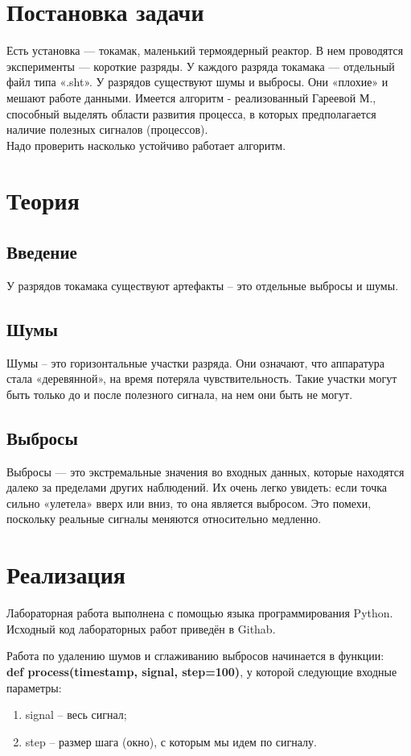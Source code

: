 \documentclass[main.tex]{subfiles}
\begin{document}
	
	\newpage
	\listoffigures{}
	\newpage
	
\section{Постановка задачи}
	Есть установка — токамак, маленький термоядерный реактор. В нем проводятся эксперименты — короткие разряды. \cite{tok} У каждого разряда токамака — отдельный файл типа «.sht».
	У разрядов существуют шумы и выбросы. Они «плохие» и мешают работе данными.
	Имеется алгоритм - реализованный Гареевой М., способный выделять области развития процесса, в которых предполагается наличие полезных сигналов (процессов).\\
	Надо проверить насколько устойчиво работает алгоритм.
	
\section{Теория}
	\subsection{Введение}
		У разрядов токамака существуют артефакты – это отдельные выбросы и шумы.
	\subsection{Шумы}
		Шумы – это горизонтальные участки разряда. Они означают, что аппаратура стала «деревянной», на время потеряла чувствительность. Такие участки могут быть только до и после полезного сигнала, на нем они быть не могут.
	\subsection{Выбросы}
		Выбросы — это экстремальные значения во входных данных, которые находятся далеко за пределами других наблюдений. Их очень легко увидеть: если точка сильно «улетела» вверх или вниз, то она является выбросом. Это помехи, поскольку реальные сигналы меняются относительно медленно.
		
\section{Реализация}
	Лабораторная работа выполнена с помощью языка программирования Python. Исходный код лабораторных работ приведён в Githab.
	
	Работа по удалению шумов и сглаживанию выбросов начинается в функции:\\
	\textbf{def process(timestamp, signal, step=100)}, у которой следующие входные параметры:
	\begin{enumerate}
		\item signal – весь сигнал;
		\item step – размер шага (окно), с которым мы идем по сигналу.
	\end{enumerate}
\end{document}
